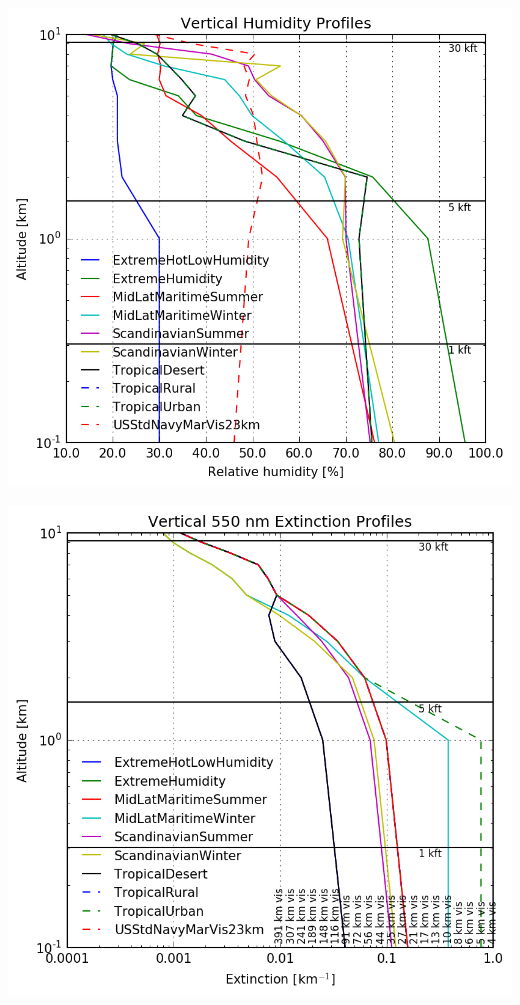 \documentclass{workpackage}
\begin{document}
\begin{center}
\includegraphics{./pic/Analyse-Standard-Atmospheres_15_2.png}
\end{center}

\begin{center}
\includegraphics{./pic/Analyse-Standard-Atmospheres_15_3.png}
\end{center}
\end{document}

